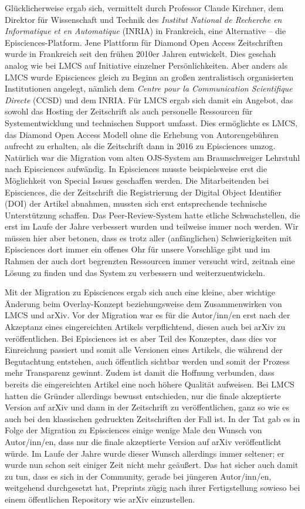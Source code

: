 \documentclass[a4paper,
fontsize=11pt,
oneside,
numbers=noperiodatend,
parskip=half-,
bibliography=totoc,
final
]{scrartcl}
\begin{document}
Glücklicherweise ergab sich, vermittelt durch Professor Claude Kirchner,
dem Direktor für Wissenschaft und Technik des \emph{Institut National de
Recherche en Informatique et en Automatique} (INRIA) in Frankreich, eine
Alternative -- die Episciences-Platform. Jene Plattform für Diamond Open
Access Zeitschriften wurde in Frankreich seit den frühen 2010er Jahren
entwickelt. Dies geschah analog wie bei LMCS auf Initiative einzelner
Persönlichkeiten. Aber anders als LMCS wurde Episciences gleich zu
Beginn an großen zentralistisch organisierten Institutionen angelegt,
nämlich dem \emph{Centre pour la Communication Scientifique Directe}
(CCSD) und dem INRIA. Für LMCS ergab sich damit ein Angebot, das sowohl
das Hosting der Zeitschrift als auch personelle Ressourcen für
Systementwicklung und technischen Support umfasst. Dies ermöglichte es
LMCS, das Diamond Open Access Modell ohne die Erhebung von
Autorengebühren aufrecht zu erhalten, als die Zeitschrift dann in 2016
zu Episciences umzog. Natürlich war die Migration vom alten OJS-System
am Braunschweiger Lehrstuhl nach Episciences aufwändig. In Episciences
musste beispielsweise erst die Möglichkeit von Special Issues geschaffen
werden. Die Mitarbeitenden bei Episciences, die der Zeitschrift die
Registrierung der Digital Object Identifier (DOI) der Artikel abnahmen,
mussten sich erst entsprechende technische Unterstützung schaffen. Das
Peer-Review-System hatte etliche Schwachstellen, die erst im Laufe der
Jahre verbessert wurden und teilweise immer noch werden. Wir müssen hier
aber betonen, dass es trotz aller (anfänglichen) Schwierigkeiten mit
Episciences dort immer ein offenes Ohr für unsere Vorschläge gibt und im
Rahmen der auch dort begrenzten Ressourcen immer versucht wird, zeitnah
eine Lösung zu finden und das System zu verbessern und
weiterzuentwickeln.

Mit der Migration zu Episciences ergab sich auch eine kleine, aber
wichtige Änderung beim Overlay-Konzept beziehungsweise dem
Zusammenwirken von LMCS und arXiv. Vor der Migration war es für die
Autor/inn/en erst nach der Akzeptanz eines eingereichten Artikels
verpflichtend, diesen auch bei arXiv zu veröffentlichen. Bei Episciences
ist es aber Teil des Konzeptes, dass dies vor Einreichung passiert und
somit alle Versionen eines Artikels, die während der Begutachtung
entstehen, auch öffentlich sichtbar werden und somit der Prozess mehr
Transparenz gewinnt. Zudem ist damit die Hoffnung verbunden, dass
bereits die eingereichten Artikel eine noch höhere Qualität aufweisen.
Bei LMCS hatten die Gründer allerdings bewusst entschieden, nur die
finale akzeptierte Version auf arXiv und dann in der Zeitschrift zu
veröffentlichen, ganz so wie es auch bei den klassischen gedruckten
Zeitschriften der Fall ist. In der Tat gab es in Folge der Migration zu
Episciences einige wenige Male den Wunsch von Autor/inn/en, dass nur die
finale akzeptierte Version auf arXiv veröffentlicht würde. Im Laufe der
Jahre wurde dieser Wunsch allerdings immer seltener; er wurde nun schon
seit einiger Zeit nicht mehr geäußert. Das hat sicher auch damit zu tun,
dass es sich in der Community, gerade bei jüngeren Autor/inn/en,
weitgehend durchgesetzt hat, Preprints zügig nach ihrer Fertigstellung
sowieso bei einem öffentlichen Repository wie arXiv einzustellen.
\end{document}
